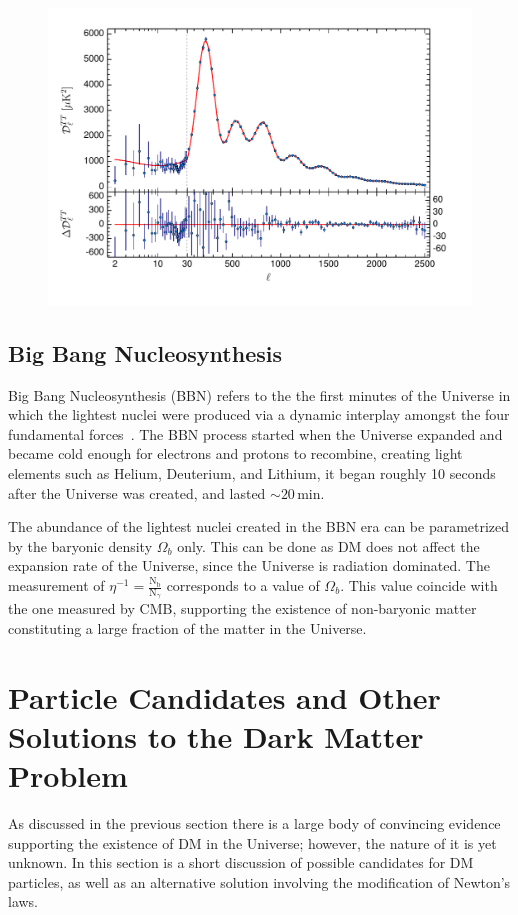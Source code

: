 \begin{figure}[]
	\centering
	\includegraphics[width=\textwidth]{figs/planck.pdf}
	\label{fig:CMB}
\end{figure}  
  
\subsection{Big Bang Nucleosynthesis}
\label{subsec:BBN}
Big Bang Nucleosynthesis (BBN) refers to the the first minutes of the Universe in which the lightest nuclei were produced via a dynamic interplay amongst the four fundamental forces~\cite{Jedamzik:2009uy}. The BBN process started when the Universe expanded and became cold enough for electrons and protons to recombine, creating light elements such as Helium, Deuterium, and Lithium, it began roughly 10 seconds after the Universe was created, and lasted $\sim20$\,min.

The abundance of the lightest nuclei created in the BBN era can be parametrized by the baryonic density $\Omega_b$ only. This can be done as DM does not affect      the expansion rate of the Universe, since the Universe is radiation dominated. The measurement of $\eta^{-1} = \frac{\mathrm{N_b}}{\mathrm{N}_\gamma}$ corresponds to a value of $\Omega_b$. This value coincide with the one measured by CMB, supporting the existence of non-baryonic matter constituting a large fraction of the matter in the Universe. 

\section{Particle Candidates and Other Solutions to the Dark Matter Problem }
As discussed in the previous section there is a large body of convincing evidence  supporting the existence of DM in the Universe; however, the nature of it is yet unknown. In this section is a short discussion of possible candidates for DM particles, as well as an alternative solution involving the modification of Newton's laws.

